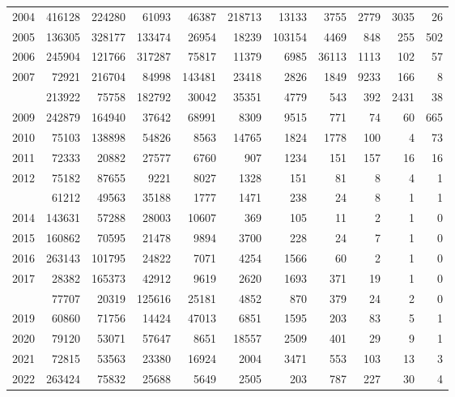 \documentclass[
]{article}
\begin{document}
\begin{longtable}[t]{lrrrrrrrrrr}
2004 & 416128 & 224280 & 61093 & 46387 & 218713 & 13133 & 3755 & 2779 & 3035 & 26\\
2005 & 136305 & 328177 & 133474 & 26954 & 18239 & 103154 & 4469 & 848 & 255 & 502\\
2006 & 245904 & 121766 & 317287 & 75817 & 11379 & 6985 & 36113 & 1113 & 102 & 57\\
2007 & 72921 & 216704 & 84998 & 143481 & 23418 & 2826 & 1849 & 9233 & 166 & 8\\
\addlinespace
2008 & 213922 & 75758 & 182792 & 30042 & 35351 & 4779 & 543 & 392 & 2431 & 38\\
2009 & 242879 & 164940 & 37642 & 68991 & 8309 & 9515 & 771 & 74 & 60 & 665\\
2010 & 75103 & 138898 & 54826 & 8563 & 14765 & 1824 & 1778 & 100 & 4 & 73\\
2011 & 72333 & 20882 & 27577 & 6760 & 907 & 1234 & 151 & 157 & 16 & 16\\
2012 & 75182 & 87655 & 9221 & 8027 & 1328 & 151 & 81 & 8 & 4 & 1\\
\addlinespace
2013 & 61212 & 49563 & 35188 & 1777 & 1471 & 238 & 24 & 8 & 1 & 1\\
2014 & 143631 & 57288 & 28003 & 10607 & 369 & 105 & 11 & 2 & 1 & 0\\
2015 & 160862 & 70595 & 21478 & 9894 & 3700 & 228 & 24 & 7 & 1 & 0\\
2016 & 263143 & 101795 & 24822 & 7071 & 4254 & 1566 & 60 & 2 & 1 & 0\\
2017 & 28382 & 165373 & 42912 & 9619 & 2620 & 1693 & 371 & 19 & 1 & 0\\
\addlinespace
2018 & 77707 & 20319 & 125616 & 25181 & 4852 & 870 & 379 & 24 & 2 & 0\\
2019 & 60860 & 71756 & 14424 & 47013 & 6851 & 1595 & 203 & 83 & 5 & 1\\
2020 & 79120 & 53071 & 57647 & 8651 & 18557 & 2509 & 401 & 29 & 9 & 1\\
2021 & 72815 & 53563 & 23380 & 16924 & 2004 & 3471 & 553 & 103 & 13 & 3\\
2022 & 263424 & 75832 & 25688 & 5649 & 2505 & 203 & 787 & 227 & 30 & 4\\*
\end{longtable}
\end{document}
